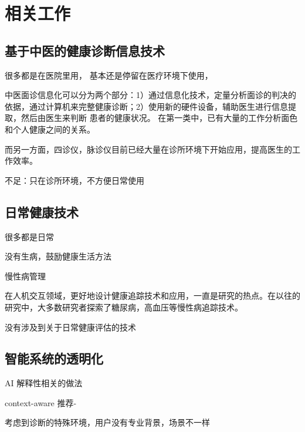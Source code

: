 \chapter{相关工作}

\section{基于中医的健康诊断信息技术}

很多都是在医院里用， 基本还是停留在医疗环境下使用，

中医面诊信息化可以分为两个部分：1）通过信息化技术，定量分析面诊的判决的依据，通过计算机来完整健康诊断；2）使用新的硬件设备，辅助医生进行信息提取，然后由医生来判断
患者的健康状况。
在第一类中，已有大量的工作分析面色和个人健康之间的关系。

而另一方面，四诊仪，脉诊仪目前已经大量在诊所环境下开始应用，提高医生的工作效率。

不足：只在诊所环境，不方便日常使用

\section{日常健康技术}



很多都是日常

没有生病，鼓励健康生活方法

慢性病管理

在人机交互领域，更好地设计健康追踪技术和应用，一直是研究的热点。在以往的研究中，大多数研究者探索了糖尿病，高血压等慢性病追踪技术。




没有涉及到关于日常健康评估的技术

\section{智能系统的透明化}

AI 解释性相关的做法

context-aware
推荐-

考虑到诊断的特殊环境，用户没有专业背景，场景不一样